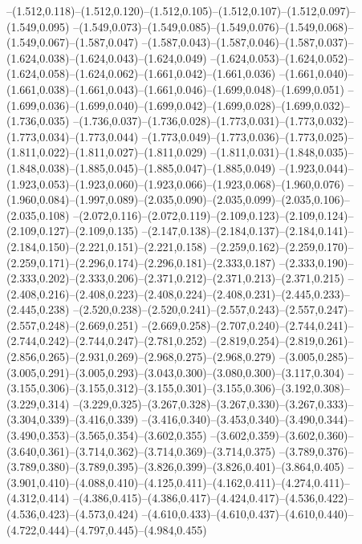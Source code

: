   --(1.512,0.118)--(1.512,0.120)--(1.512,0.105)--(1.512,0.107)--(1.512,0.097)--(1.549,0.095)%
  --(1.549,0.073)--(1.549,0.085)--(1.549,0.076)--(1.549,0.068)--(1.549,0.067)--(1.587,0.047)%
  --(1.587,0.043)--(1.587,0.046)--(1.587,0.037)--(1.624,0.038)--(1.624,0.043)--(1.624,0.049)%
  --(1.624,0.053)--(1.624,0.052)--(1.624,0.058)--(1.624,0.062)--(1.661,0.042)--(1.661,0.036)%
  --(1.661,0.040)--(1.661,0.038)--(1.661,0.043)--(1.661,0.046)--(1.699,0.048)--(1.699,0.051)%
  --(1.699,0.036)--(1.699,0.040)--(1.699,0.042)--(1.699,0.028)--(1.699,0.032)--(1.736,0.035)%
  --(1.736,0.037)--(1.736,0.028)--(1.773,0.031)--(1.773,0.032)--(1.773,0.034)--(1.773,0.044)%
  --(1.773,0.049)--(1.773,0.036)--(1.773,0.025)--(1.811,0.022)--(1.811,0.027)--(1.811,0.029)%
  --(1.811,0.031)--(1.848,0.035)--(1.848,0.038)--(1.885,0.045)--(1.885,0.047)--(1.885,0.049)%
  --(1.923,0.044)--(1.923,0.053)--(1.923,0.060)--(1.923,0.066)--(1.923,0.068)--(1.960,0.076)%
  --(1.960,0.084)--(1.997,0.089)--(2.035,0.090)--(2.035,0.099)--(2.035,0.106)--(2.035,0.108)%
  --(2.072,0.116)--(2.072,0.119)--(2.109,0.123)--(2.109,0.124)--(2.109,0.127)--(2.109,0.135)%
  --(2.147,0.138)--(2.184,0.137)--(2.184,0.141)--(2.184,0.150)--(2.221,0.151)--(2.221,0.158)%
  --(2.259,0.162)--(2.259,0.170)--(2.259,0.171)--(2.296,0.174)--(2.296,0.181)--(2.333,0.187)%
  --(2.333,0.190)--(2.333,0.202)--(2.333,0.206)--(2.371,0.212)--(2.371,0.213)--(2.371,0.215)%
  --(2.408,0.216)--(2.408,0.223)--(2.408,0.224)--(2.408,0.231)--(2.445,0.233)--(2.445,0.238)%
  --(2.520,0.238)--(2.520,0.241)--(2.557,0.243)--(2.557,0.247)--(2.557,0.248)--(2.669,0.251)%
  --(2.669,0.258)--(2.707,0.240)--(2.744,0.241)--(2.744,0.242)--(2.744,0.247)--(2.781,0.252)%
  --(2.819,0.254)--(2.819,0.261)--(2.856,0.265)--(2.931,0.269)--(2.968,0.275)--(2.968,0.279)%
  --(3.005,0.285)--(3.005,0.291)--(3.005,0.293)--(3.043,0.300)--(3.080,0.300)--(3.117,0.304)%
  --(3.155,0.306)--(3.155,0.312)--(3.155,0.301)--(3.155,0.306)--(3.192,0.308)--(3.229,0.314)%
  --(3.229,0.325)--(3.267,0.328)--(3.267,0.330)--(3.267,0.333)--(3.304,0.339)--(3.416,0.339)%
  --(3.416,0.340)--(3.453,0.340)--(3.490,0.344)--(3.490,0.353)--(3.565,0.354)--(3.602,0.355)%
  --(3.602,0.359)--(3.602,0.360)--(3.640,0.361)--(3.714,0.362)--(3.714,0.369)--(3.714,0.375)%
  --(3.789,0.376)--(3.789,0.380)--(3.789,0.395)--(3.826,0.399)--(3.826,0.401)--(3.864,0.405)%
  --(3.901,0.410)--(4.088,0.410)--(4.125,0.411)--(4.162,0.411)--(4.274,0.411)--(4.312,0.414)%
  --(4.386,0.415)--(4.386,0.417)--(4.424,0.417)--(4.536,0.422)--(4.536,0.423)--(4.573,0.424)%
  --(4.610,0.433)--(4.610,0.437)--(4.610,0.440)--(4.722,0.444)--(4.797,0.445)--(4.984,0.455)%
